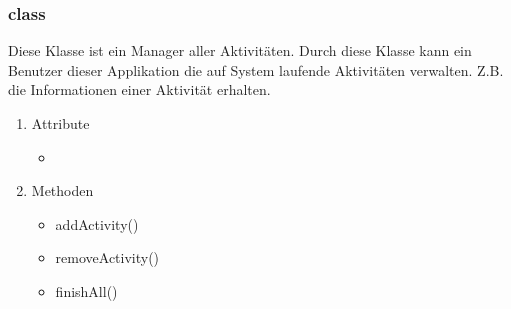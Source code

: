\documentclass[a4paper]{scrreprt}
\begin{document}
                \subsubsection{class }
                Diese Klasse ist ein Manager aller Aktivitäten. Durch diese Klasse kann ein Benutzer dieser Applikation die auf System laufende Aktivitäten verwalten. Z.B. die Informationen einer Aktivität erhalten.
                \begin{enumerate}
                \item Attribute
                     \begin{itemize}
                            \item {}
                     \end{itemize}
                \item Methoden
                     \begin{itemize}
                                \item addActivity()
                                \item removeActivity()
                                \item finishAll()
                     \end{itemize}
                \end{enumerate}
\end{document}
